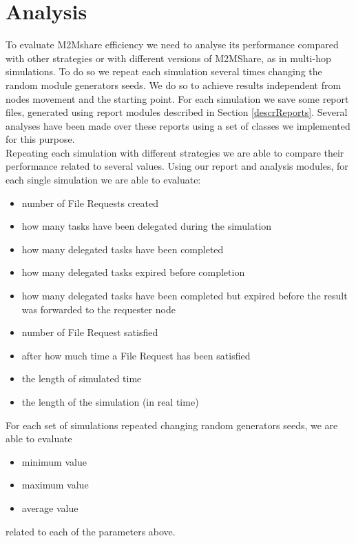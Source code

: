 \section{Analysis}
To evaluate M2Mshare efficiency we need to analyse its performance compared with other strategies or with different versions of M2MShare, as in multi-hop simulations. To do so we repeat each simulation several times changing the random module generators seeds. We do so to achieve results independent from nodes movement and the starting point. For each simulation we save some report files, generated using report modules described in Section \ref{descrReports}. Several analyses have been made over these reports using a set of classes we implemented for this purpose. 
\\

Repeating each simulation with different strategies we are able to compare their performance related to several values. Using our report and analysis modules, for each single simulation we are able to evaluate:
\begin{itemize}
\item number of File Requests created
\item how many tasks have been delegated during the simulation
\item how many delegated tasks have been completed
\item how many delegated tasks expired before completion
\item how many delegated tasks have been completed but expired before the result was forwarded to the requester node
\item number of File Request satisfied
\item after how much time a File Request has been satisfied
\item the length of simulated time
\item the length of the simulation (in real time)
\end{itemize} 

For each set of simulations repeated changing random generators seeds, we are able to evaluate 
\begin{itemize}
\item minimum value
\item maximum value
\item average value
\end{itemize} 
related to each of the parameters above.
 

